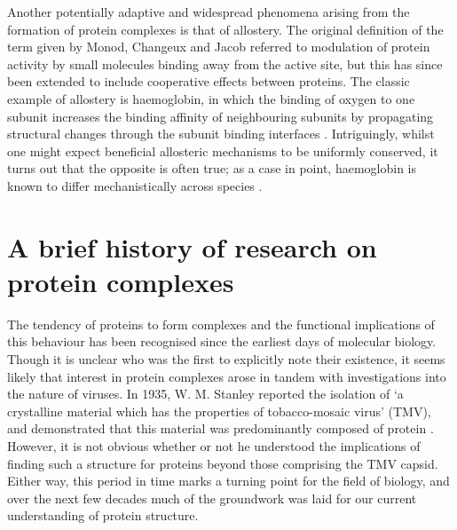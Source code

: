 \documentclass[a4paper,11pt,twoside,openright]{scrbook}
\begin{document}
Another potentially adaptive and widespread phenomena arising from the formation
of protein complexes is that of allostery. The original definition of the term
given by Monod, Changeux and Jacob \cite{Monod1963} referred to modulation of
protein activity by small molecules binding away from the active site, but this
has since been extended to include cooperative effects between proteins. The
classic example of allostery is haemoglobin, in which the binding of oxygen to
one subunit increases the binding affinity of neighbouring subunits by
propagating structural changes through the subunit binding interfaces
\cite{Perutz1976}. Intriguingly, whilst one might expect beneficial allosteric
mechanisms to be uniformly conserved, it turns out that the opposite is often
true; as a case in point, haemoglobin is known to differ mechanistically across
species \cite{Kolatkar1988,Royer2005,Bellelli2011}.

\section{A brief history of research on protein complexes}
The tendency of proteins to form complexes and the functional implications of
this behaviour has been recognised since the earliest days of molecular biology.
Though it is unclear who was the first to explicitly note their existence, it
seems likely that interest in protein complexes arose in tandem with
investigations into the nature of viruses. In 1935, W. M. Stanley reported the
isolation of `a crystalline material which has the properties of tobacco-mosaic
virus' (TMV), and demonstrated that this material was predominantly composed of
protein \cite{Stanley1935}. However, it is not obvious whether or not he
understood the implications of finding such a structure for proteins beyond
those comprising the TMV capsid. Either way, this period in time marks a turning
point for the field of biology, and over the next few decades much of the
groundwork was laid for our current understanding of protein structure.
\end{document}
